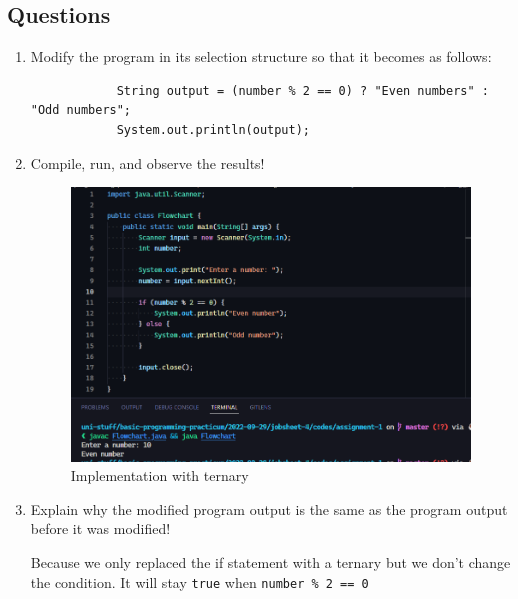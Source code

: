 \documentclass[12pt,titlepage]{article}
\begin{document}
\subsection*{Questions}
\begin{enumerate}
    \item {
        Modify the program in its selection structure so that it becomes as follows:

        \begin{verbatim}
            String output = (number % 2 == 0) ? "Even numbers" : "Odd numbers";
            System.out.println(output);
        \end{verbatim}
    }
    \item {
        Compile, run, and observe the results!

        \begin{figure}[h]
            \centering
            \includegraphics[width=.8\textwidth]{./images/flowchart-impl.png}
            \caption{Implementation with ternary}
        \end{figure}
    }
    \item {
        Explain why the modified program output is the same as the program output before it was modified!

        Because we only replaced the if statement with a ternary but we don't change the condition.
        It will stay \texttt{true} when \texttt{number \% 2 == 0}
    }
\end{enumerate}
\pagebreak
\end{document}
